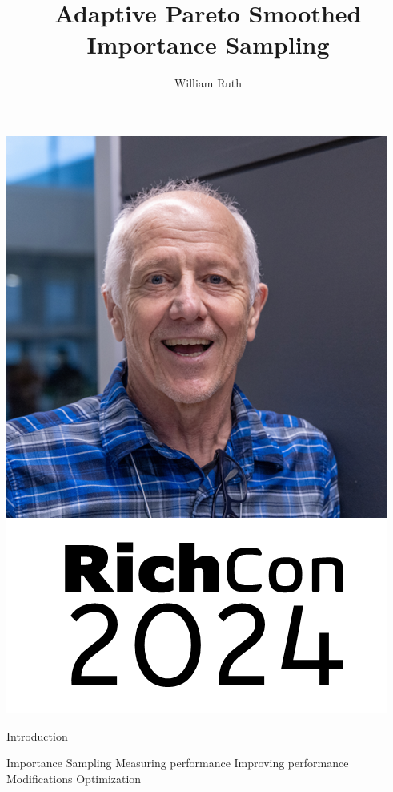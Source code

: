 \documentclass[14pt]{beamer}
\title[]{Adaptive Pareto Smoothed Importance Sampling}
\author{William Ruth}
\institute[]{Joint work with Payman Nickchi}
\date{\vspace{-3cm}}
\begin{document}
\begin{frame}
    \titlepage
\end{frame}

\begin{frame}
    \centering
    \includegraphics[height=0.9\textheight]{Figures/RichCon2.png}
\end{frame}

\begin{frame}{Introduction}
    \begin{outline}
        \1 Importance Sampling \newline
        \1 Measuring performance \newline
        \1 Improving performance
            \2 Modifications
            \2 Optimization
    \end{outline}
\end{frame}
\end{document}

